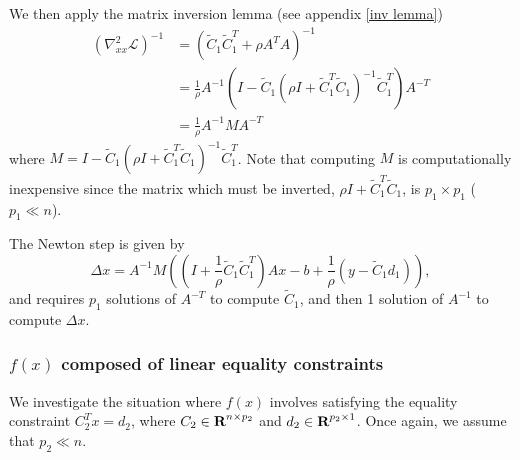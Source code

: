 \documentclass{article}
\newcommand{\inv}[1]{\frac{1}{#1}}
\newcommand{\tC}{\tilde{C}}
\begin{document}
We then apply the matrix inversion lemma (see appendix \ref{inv lemma})
    \begin{equation}\begin{split}
    (\nabla_{xx}^2 \mathcal{L})^{-1} &= (\tC_1\tC_1^T + \rho A^T A)^{-1} \\
        &= \inv{\rho} A^{-1} 
            (I - \tC_1(\rho I + \tC_1^T\tC_1)^{-1}\tC_1^T) A^{-T} \\
        &= \inv{\rho} A^{-1} M A^{-T}
    \end{split}\end{equation}
    where $M = I - \tC_1(\rho I + \tC_1^T\tC_1)^{-1}\tC_1^T$.
Note that computing $M$ is computationally inexpensive
    since the matrix which must be inverted, $\rho I + \tC_1^T\tC_1$,
    is $p_1 \times p_1$ ($p_1 \ll n$).

The Newton step is given by
    \begin{equation}
    \Delta x = A^{-1}M ((I + \inv{\rho}\tC_1\tC_1^T)Ax
        - b + \inv{\rho}(y - \tC_1 d_1)),
    \end{equation}
    and requires $p_1$ solutions of $A^{-T}$ to compute $\tC_1$, 
    and then 1 solution of $A^{-1}$ to compute $\Delta x$.


\subsubsection{$f(x)$ composed of linear equality constraints}
We investigate the situation where $f(x)$ involves
    satisfying the equality constraint $C_2^T x = d_2$,
    where $C_2 \in {\mbox{\bf R}}^{n \times p_2}$
    and $d_2 \in {\mbox{\bf R}}^{p_2 \times 1}$.
Once again, we assume that $p_2 \ll n$.
\end{document}
